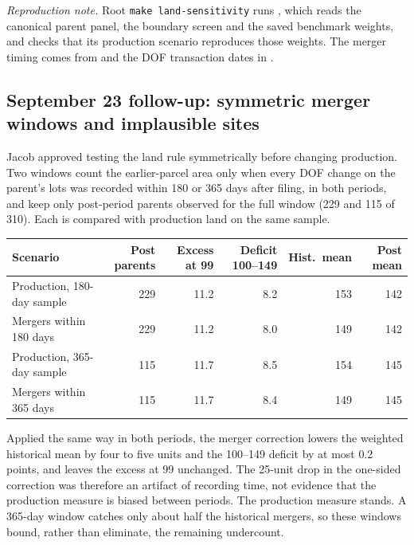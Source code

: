 \textit{Reproduction note.} Root \texttt{make land-sensitivity} runs
, which reads the
canonical parent panel, the boundary screen and the saved benchmark weights,
and checks that its production scenario reproduces those weights. The merger
timing comes from  and the DOF transaction dates in
.

\subsection*{September 23 follow-up: symmetric merger windows and implausible sites}

Jacob approved testing the land rule symmetrically before changing production.
Two windows count the earlier-parcel area only when every DOF change on the
parent's lots was recorded within 180 or 365 days after filing, in both
periods, and keep only post-period parents observed for the full window (229
and 115 of 310). Each is compared with production land on the same sample.

\begin{center}
\small
\begin{tabular}{lrrrrr}
\hline
Scenario & Post parents & Excess at 99 & Deficit 100--149 & Hist.\ mean & Post mean \\
\hline
Production, 180-day sample & 229 & 11.2 & 8.2 & 153 & 142 \\
Mergers within 180 days & 229 & 11.2 & 8.0 & 149 & 142 \\
Production, 365-day sample & 115 & 11.7 & 8.5 & 154 & 145 \\
Mergers within 365 days & 115 & 11.7 & 8.4 & 149 & 145 \\
\hline
\end{tabular}
\end{center}

Applied the same way in both periods, the merger correction lowers the
weighted historical mean by four to five units and the 100--149 deficit by at
most 0.2 points, and leaves the excess at 99 unchanged. The 25-unit drop in the
one-sided correction was therefore an artifact of recording time, not evidence
that the production measure is biased between periods. The production measure
stands. A 365-day window catches only about half the historical mergers, so
these windows bound, rather than eliminate, the remaining undercount.

